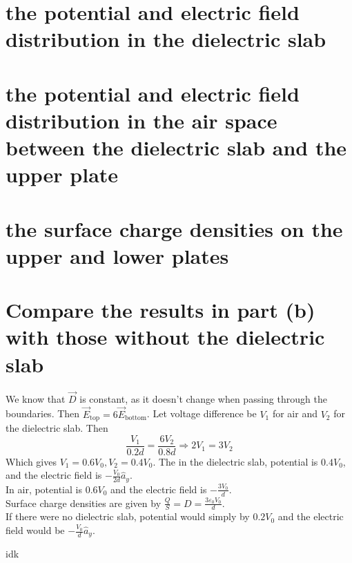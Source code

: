 \documentclass[answers]{exam}
\begin{document}
\begin{questions}
\begin{parts}
    \part{the potential and electric field distribution in the dielectric slab}
    \part{the potential and electric field distribution in the air space between the dielectric slab and the upper plate}
    \part{the surface charge densities on the upper and lower plates}
    \part{Compare the results in part (b) with those without the dielectric slab}
\end{parts}

\begin{solution}
    We know that $\vec D$ is constant, as it doesn't change when passing through the boundaries. Then $\vec E_{\text{top}} = 6\vec E_{\text{bottom}}$. Let voltage difference be $V_1$ for air and $V_2$ for the dielectric slab. Then
    $$\frac{V_1}{0.2d} = \frac{6V_2}{0.8d} \Rightarrow 2V_1 = 3V_2$$
    Which gives $V_1 = 0.6V_0, V_2 = 0.4V_0$. The in the dielectric slab, potential is $0.4V_0$, and the electric field is $-\frac{V_0}{2d} \hat a_y$. \\
    In air, potential is $0.6V_0$ and the electric field is $-\frac{3V_0}{d}$. \\
    Surface charge densities are given by $\frac{Q}{S} = D = \frac{3\varepsilon_0V_0}{d}$. \\
    If there were no dielectric slab, potential would simply by $0.2V_0$ and the electric field would be $-\frac{V_0}{d} \hat a_y$.
\end{solution}


\begin{solution}
    idk
\end{solution}


\end{questions}
\end{document}
